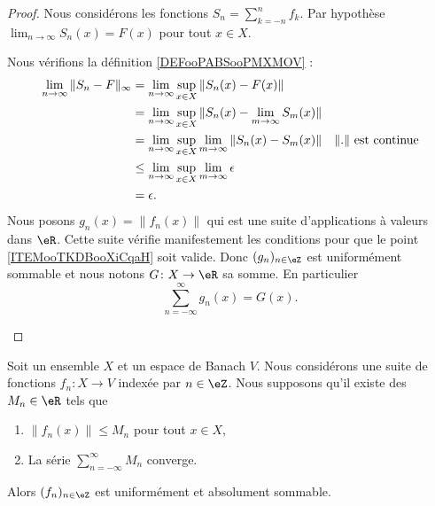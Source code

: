 \begin{proof}
	Nous considérons les fonctions \( S_n=\sum_{k=-n}^nf_k\). Par hypothèse \( \lim_{n\to\infty}S_n(x)=F(x)\) pour tout \( x\in X\).
	\begin{subproof}
		Nous vérifions la définition \ref{DEFooPABSooPMXMOV} :
		\begin{subequations}
			\begin{align}
				\lim_{n\to \infty}\| S_n-F \|_{\infty} & =\lim_{n\to \infty}\sup_{x\in X}\| S_n(x)-F(x) \|                                                        \\
				                                       & =\lim_{n\to \infty}\sup_{x\in X}\| S_n(x)-\lim_{m\to \infty}S_m(x) \|                                    \\
				                                       & =\lim_{n\to \infty}\sup_{x\in X}\lim_{m\to \infty}\| S_n(x)-S_m(x) \| & \text{\( \| . \|\) est continue} \\
				                                       & \leq\lim_{n\to \infty}\sup_{x\in X}\lim_{m\to \infty}\epsilon                                            \\
				                                       & =\epsilon.
			\end{align}
		\end{subequations}
		Nous posons \( g_n(x)=\| f_n(x) \|\) qui est une suite d'applications à valeurs dans \( \eR\). Cette suite vérifie manifestement les conditions pour que le point \ref{ITEMooTKDBooXiCqaH} soit valide. Donc \( (g_n)_{n\in \eZ}\) est uniformément sommable et nous notons \(G \colon X\to \eR  \) sa somme. En particulier
		\begin{equation}
			\sum_{n=-\infty}^{\infty}g_n(x)=G(x).
		\end{equation}
	\end{subproof}
\end{proof}

\begin{proposition}	\label{PROPooGFBBooNpczQo}
	Soit un ensemble \( X\) et un espace de Banach \( V\). Nous considérons une suite de fonctions \(f_n \colon X\to V  \) indexée par \( n\in \eZ\). Nous supposons qu'il existe des \( M_n\in \eR\) tels que
	\begin{enumerate}
		\item
		      \( \| f_n(x) \|\leq M_n\) pour tout \( x\in X\),
		\item
		      La série \( \sum_{n=-\infty}^{\infty}M_n\) converge.
	\end{enumerate}
	Alors \( (f_n)_{n\in \eZ}\) est uniformément et absolument sommable.
\end{proposition}

